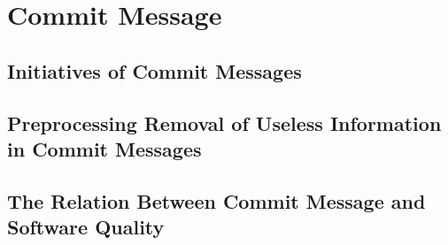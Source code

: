 \section{Commit Message}
\subsection{Initiatives of Commit Messages}
\subsection{Preprocessing Removal of Useless Information in Commit Messages}
\subsection{The Relation Between Commit Message and Software Quality}